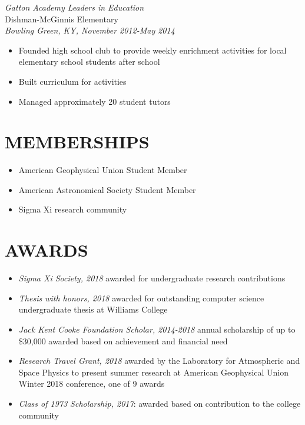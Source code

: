 \documentclass[line,margin]{res}
\begin{document}
\begin{resume}
  {\sl Gatton Academy Leaders in Education} \\
  Dishman-McGinnis Elementary \\
  {\it Bowling Green, KY, November 2012-May 2014}
  \begin{itemize}
  \item Founded high school club to provide weekly enrichment activities for local elementary school students after school
  \item Built curriculum for activities
  \item Managed approximately 20 student tutors
  \end{itemize}
  
  \section{MEMBERSHIPS}
  \begin{itemize}[leftmargin=*]
  \item  American Geophysical Union Student Member
  \item American Astronomical Society Student Member
  \item Sigma Xi research community
  \end{itemize}
  
  \section{AWARDS}
  \begin{itemize}[leftmargin=*]
    \item {\sl Sigma Xi Society, 2018} awarded for undergraduate research contributions
    \item {\sl Thesis with honors, 2018} awarded for outstanding computer science undergraduate thesis at Williams College
    \item {\sl Jack Kent Cooke Foundation Scholar, 2014-2018} annual scholarship of up to \$30,000 awarded based on achievement and financial need 
    \item {\sl Research Travel Grant, 2018} awarded by the Laboratory for Atmospheric and Space Physics to present summer research at American Geophysical Union Winter 2018 conference, one of 9 awards
    \item {\sl Class of 1973 Scholarship, 2017}: awarded based on contribution to the college community
  \end{itemize}


\end{resume}
\end{document}
